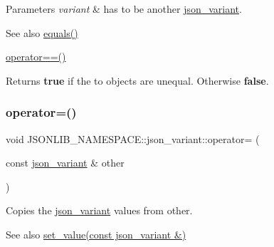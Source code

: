 \begin{DoxyParams}{Parameters}
{\em variant} & has to be another \hyperlink{classJSONLIB__NAMESPACE_1_1json__variant}{json\+\_\+variant}. \\
\hline
\end{DoxyParams}
\begin{DoxySeeAlso}{See also}
\hyperlink{classJSONLIB__NAMESPACE_1_1json__variant_ae68b9cb156c2b2f9e12c7f889634b63a}{equals()} 

\hyperlink{classJSONLIB__NAMESPACE_1_1json__variant_aef1fc1a342cc170da06e0d3eb1299aad}{operator==()} 
\end{DoxySeeAlso}
\begin{DoxyReturn}{Returns}
{\bfseries true} if the to objects are unequal. Otherwise {\bfseries false}. 
\end{DoxyReturn}
\mbox{\label{classJSONLIB__NAMESPACE_1_1json__variant_acab384801617885ba1dc3b965a456e7e}} 
\subsubsection{\texorpdfstring{operator=()}{operator=()}\hspace{0.1cm}{\footnotesize\ttfamily [1/2]}}
{\footnotesize\ttfamily void J\+S\+O\+N\+L\+I\+B\+\_\+\+N\+A\+M\+E\+S\+P\+A\+C\+E\+::json\+\_\+variant\+::operator= (\begin{DoxyParamCaption}\item[{const \hyperlink{classJSONLIB__NAMESPACE_1_1json__variant}{json\+\_\+variant} \&}]{other }\end{DoxyParamCaption})\hspace{0.3cm}{\ttfamily [inline]}}



Copies the \hyperlink{classJSONLIB__NAMESPACE_1_1json__variant}{json\+\_\+variant} values from {\ttfamily other}. 

\begin{DoxySeeAlso}{See also}
\hyperlink{classJSONLIB__NAMESPACE_1_1json__variant_a75b05acb8473015edd7f21de1656b2b1}{set\+\_\+value(const json\+\_\+variant \&)} 
\end{DoxySeeAlso}
\mbox{\label{classJSONLIB__NAMESPACE_1_1json__variant_acab384801617885ba1dc3b965a456e7e}} 
